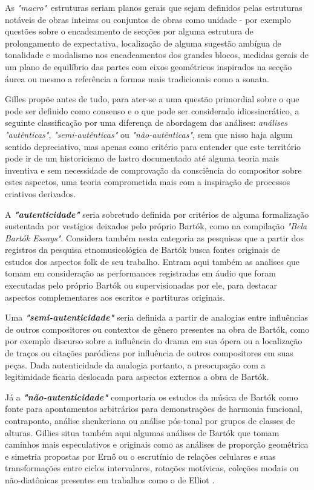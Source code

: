 \documentclass[
	12pt,				%
	openright,			%
	twoside,			%
	a4paper,			%
	english,			%
	french,				%
	spanish,			%
	brazil				%
	]{abntex2}
\begin{document}
As \textit{"macro"}\ estruturas seriam planos gerais que sejam definidos pelas estruturas notáveis de obras inteiras ou conjuntos de obras como unidade - por exemplo questões sobre o encadeamento de secções por alguma estrutura de prolongamento de expectativa, localização de alguma sugestão ambígua de tonalidade e modalismo nos encadeamentos dos grandes blocos, medidas gerais de um plano de equilíbrio das partes com eixos geométricos inspirados na secção áurea ou mesmo a referência a formas mais tradicionais como a sonata.

Gilles propõe antes de tudo, para ater-se a uma questão primordial sobre o que pode ser definido como consenso e o que pode ser considerado idiossincrático, a seguinte classificação por uma diferença de abordagem das análises: \textit{análises "autênticas"}, \textit{"semi-autênticas"} ou \textit{"não-autênticas"}, sem que nisso haja algum sentido depreciativo, mas apenas como critério para entender que este território pode ir de um historicismo de lastro documentado até alguma teoria mais inventiva e sem necessidade de comprovação da consciência do compositor sobre estes aspectos, uma teoria comprometida mais com a inspiração de processos criativos derivados.

\pagebreak
A \textit{\textbf{"autenticidade"}} seria sobretudo definida por critérios de alguma formalização sustentada por vestígios deixados pelo próprio Bartók, como na compilação \textit{"Bela Bartók Essays"}\cite{bartok1993bela}. Considera também nesta categoria as pesquisas que a partir dos registros da pesquisa etnomusicológica de Bartók busca fontes originais de estudos dos aspectos folk de seu trabalho. Entram aqui também as analises que tomam em consideração as performances registradas em áudio que foram executadas pelo próprio Bartók ou supervisionadas por ele, para destacar aspectos complementares aos escritos e partituras originais. 

Uma \textit{\textbf{"semi-autenticidade"}} seria definida a partir de analogias entre influências de outros compositores ou contextos de gênero presentes na obra de Bartók, como por exemplo discurso sobre a influência do drama em sua ópera ou a localização de traços ou citações paródicas por influência de outros compositores em suas peças. Dada autenticidade da analogia portanto, a preocupação com a legitimidade ficaria deslocada para aspectos externos a obra de Bartók.

Já a \textit{\textbf{"não-autenticidade"}} comportaria os estudos da música de Bartók como fonte para apontamentos arbitrários para demonstrações de harmonia funcional, contraponto, análise shenkeriana ou análise pós-tonal por grupos de classes de alturas. Gillies situa também aqui algumas análises de Bartók que tomam caminhos mais especulativos e originais como as análises de proporção geométrica e simetria propostas por Ern{\H{o}}   ou o escrutínio de relações celulares e suas transformações entre ciclos intervalares, rotações motívicas, coleções modais ou não-diatônicas presentes em trabalhos como o de Elliot . 
\end{document}
